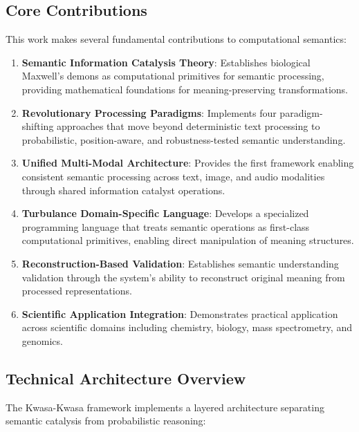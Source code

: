 \documentclass[12pt,a4paper,twoside]{article}
\begin{document}
\subsection{Core Contributions}

This work makes several fundamental contributions to computational semantics:

\begin{enumerate}[label=(\arabic*)]
\item \textbf{Semantic Information Catalysis Theory}: Establishes biological Maxwell's demons as computational primitives for semantic processing, providing mathematical foundations for meaning-preserving transformations.

\item \textbf{Revolutionary Processing Paradigms}: Implements four paradigm-shifting approaches that move beyond deterministic text processing to probabilistic, position-aware, and robustness-tested semantic understanding.

\item \textbf{Unified Multi-Modal Architecture}: Provides the first framework enabling consistent semantic processing across text, image, and audio modalities through shared information catalyst operations.

\item \textbf{Turbulance Domain-Specific Language}: Develops a specialized programming language that treats semantic operations as first-class computational primitives, enabling direct manipulation of meaning structures.

\item \textbf{Reconstruction-Based Validation}: Establishes semantic understanding validation through the system's ability to reconstruct original meaning from processed representations.

\item \textbf{Scientific Application Integration}: Demonstrates practical application across scientific domains including chemistry, biology, mass spectrometry, and genomics.
\end{enumerate}

\subsection{Technical Architecture Overview}

The Kwasa-Kwasa framework implements a layered architecture separating semantic catalysis from probabilistic reasoning:
\end{document}
